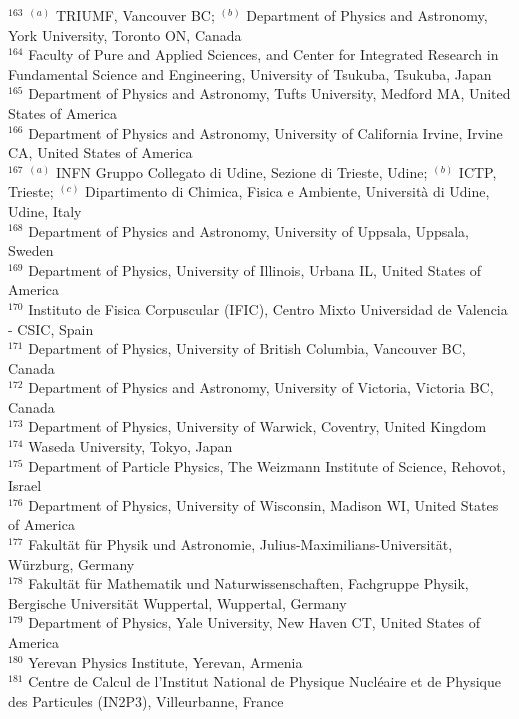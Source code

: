 \begin{flushleft}
$^{163}$ $^{(a)}$ TRIUMF, Vancouver BC; $^{(b)}$ Department of Physics and Astronomy, York University, Toronto ON, Canada\\
$^{164}$ Faculty of Pure and Applied Sciences, and Center for Integrated Research in Fundamental Science and Engineering, University of Tsukuba, Tsukuba, Japan\\
$^{165}$ Department of Physics and Astronomy, Tufts University, Medford MA, United States of America\\
$^{166}$ Department of Physics and Astronomy, University of California Irvine, Irvine CA, United States of America\\
$^{167}$ $^{(a)}$ INFN Gruppo Collegato di Udine, Sezione di Trieste, Udine; $^{(b)}$ ICTP, Trieste; $^{(c)}$ Dipartimento di Chimica, Fisica e Ambiente, Universit{\`a} di Udine, Udine, Italy\\
$^{168}$ Department of Physics and Astronomy, University of Uppsala, Uppsala, Sweden\\
$^{169}$ Department of Physics, University of Illinois, Urbana IL, United States of America\\
$^{170}$ Instituto de Fisica Corpuscular (IFIC), Centro Mixto Universidad de Valencia - CSIC, Spain\\
$^{171}$ Department of Physics, University of British Columbia, Vancouver BC, Canada\\
$^{172}$ Department of Physics and Astronomy, University of Victoria, Victoria BC, Canada\\
$^{173}$ Department of Physics, University of Warwick, Coventry, United Kingdom\\
$^{174}$ Waseda University, Tokyo, Japan\\
$^{175}$ Department of Particle Physics, The Weizmann Institute of Science, Rehovot, Israel\\
$^{176}$ Department of Physics, University of Wisconsin, Madison WI, United States of America\\
$^{177}$ Fakult{\"a}t f{\"u}r Physik und Astronomie, Julius-Maximilians-Universit{\"a}t, W{\"u}rzburg, Germany\\
$^{178}$ Fakult{\"a}t f{\"u}r Mathematik und Naturwissenschaften, Fachgruppe Physik, Bergische Universit{\"a}t Wuppertal, Wuppertal, Germany\\
$^{179}$ Department of Physics, Yale University, New Haven CT, United States of America\\
$^{180}$ Yerevan Physics Institute, Yerevan, Armenia\\
$^{181}$ Centre de Calcul de l'Institut National de Physique Nucl{\'e}aire et de Physique des Particules (IN2P3), Villeurbanne, France\\

\end{flushleft}
